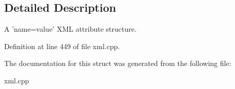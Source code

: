 \subsection{Detailed Description}
A 'name=value' XML attribute structure. 

Definition at line 449 of file xml.cpp.



The documentation for this struct was generated from the following file:\begin{DoxyCompactItemize}
\item 
xml.cpp\end{DoxyCompactItemize}
